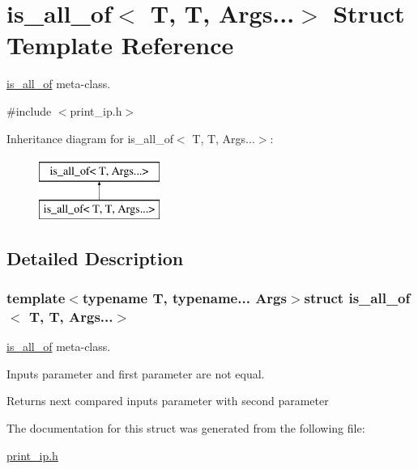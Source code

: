 \hypertarget{structis__all__of_3_01T_00_01T_00_01Args_8_8_8_4}{\section{is\-\_\-all\-\_\-of$<$ T, T, Args...$>$ Struct Template Reference}
\label{structis__all__of_3_01T_00_01T_00_01Args_8_8_8_4}
}


\hyperlink{structis__all__of}{is\-\_\-all\-\_\-of} meta-\/class.  




{\ttfamily \#include $<$print\-\_\-ip.\-h$>$}

Inheritance diagram for is\-\_\-all\-\_\-of$<$ T, T, Args...$>$\-:\begin{figure}[H]
\begin{center}
\leavevmode
\includegraphics[height=2.000000cm]{structis__all__of_3_01T_00_01T_00_01Args_8_8_8_4}
\end{center}
\end{figure}


\subsection{Detailed Description}
\subsubsection*{template$<$typename T, typename... Args$>$struct is\-\_\-all\-\_\-of$<$ T, T, Args...$>$}

\hyperlink{structis__all__of}{is\-\_\-all\-\_\-of} meta-\/class. 

Inputs parameter and first parameter are not equal. \begin{DoxyReturn}{Returns}
next compared inputs parameter with second parameter 
\end{DoxyReturn}


The documentation for this struct was generated from the following file\-:\begin{DoxyCompactItemize}
\item 
\hyperlink{print__ip_8h}{print\-\_\-ip.\-h}\end{DoxyCompactItemize}
